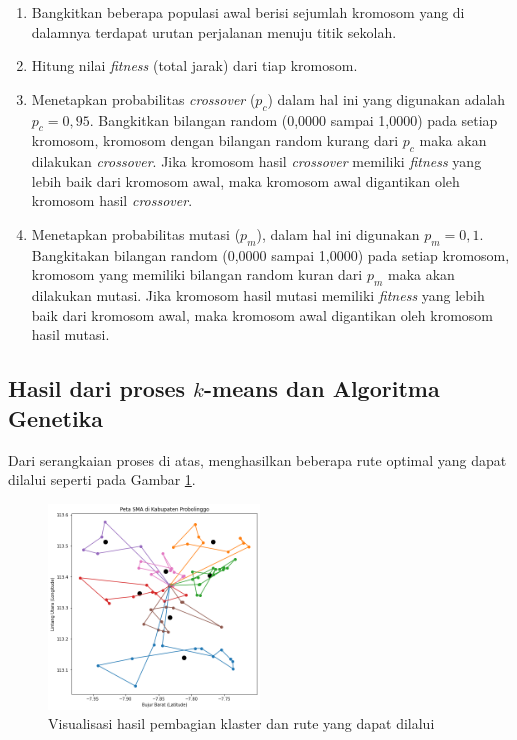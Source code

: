 \begin{enumerate}
	\item Bangkitkan beberapa populasi awal berisi sejumlah kromosom yang di dalamnya terdapat urutan perjalanan menuju titik sekolah.
	\item Hitung nilai \textit{fitness} (total jarak) dari tiap kromosom.
	\item Menetapkan probabilitas \textit{crossover} ($p_c$) dalam hal ini yang digunakan adalah $p_c=0,95$. Bangkitkan bilangan random (0,0000 sampai 1,0000) pada setiap kromosom, kromosom dengan bilangan random kurang dari $p_c$ maka akan dilakukan \textit{crossover}. Jika kromosom hasil \textit{crossover} memiliki \textit{fitness} yang lebih baik  dari kromosom awal, maka kromosom awal digantikan oleh kromosom hasil \textit{crossover}.
	\item Menetapkan probabilitas mutasi ($p_m$), dalam hal ini digunakan $p_m=0,1$. Bangkitakan bilangan random (0,0000 sampai 1,0000) pada setiap kromosom, kromosom yang memiliki bilangan random kuran dari $p_m$ maka akan dilakukan mutasi. Jika kromosom hasil mutasi memiliki \textit{fitness} yang lebih baik dari kromosom awal, maka kromosom awal digantikan oleh kromosom hasil mutasi.
\end{enumerate}

\subsection{Hasil dari proses $k$-means dan Algoritma Genetika}

Dari serangkaian proses di atas, menghasilkan beberapa rute optimal yang dapat dilalui seperti pada Gambar \ref{fig:vishasilmtsp}.

\begin{figure}[h!]
	\centering
	\includegraphics[width=0.5\textwidth]{hasil mtsp.png}
	\caption{Visualisasi hasil pembagian klaster dan rute yang dapat dilalui}
	\label{fig:vishasilmtsp}
\end{figure}